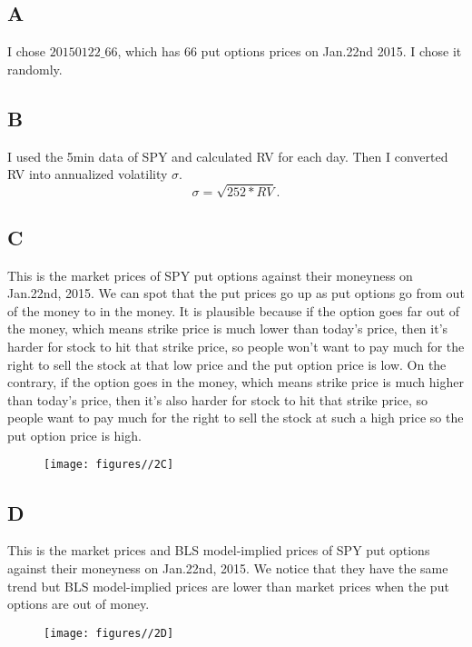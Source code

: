\documentclass{report}
\begin{document}
\subsection{A}

I chose $20150122\_66$, which has 66 put options prices on Jan.22nd 2015. I chose it randomly.

\subsection{B}

I used the 5min data of SPY and calculated RV for each day. Then I converted RV into annualized volatility $\sigma$.
\[ \sigma = \sqrt{252 * RV}. \]

\subsection{C}

This is the market prices of SPY put options against their moneyness on Jan.22nd, 2015. We can spot that the put prices go up as put options go from out of the money to in the money. It is plausible because if the option goes far out of the money, which means strike price is much lower than today's price, then it's harder for stock to hit that strike price, so people won't want to pay much for the right to sell the stock at that low price and the put option price is low. On the contrary, if the option goes in the money, which means strike price is much higher than today's price, then it's also harder for stock to hit that strike price, so people want to pay much for the right to sell the stock at such a high price so the put option price is high. 
\begin{figure}[H]
        \centering 
         \texttt{[image: figures//2C]}
\end{figure}

\subsection{D}
This is the market prices and BLS model-implied prices of SPY put options against their moneyness on Jan.22nd, 2015. We notice that they have the same trend but BLS model-implied prices are lower than market prices when the put options are out of money.
\begin{figure}[H]
        \centering 
         \texttt{[image: figures//2D]}
\end{figure}  
\end{document}
